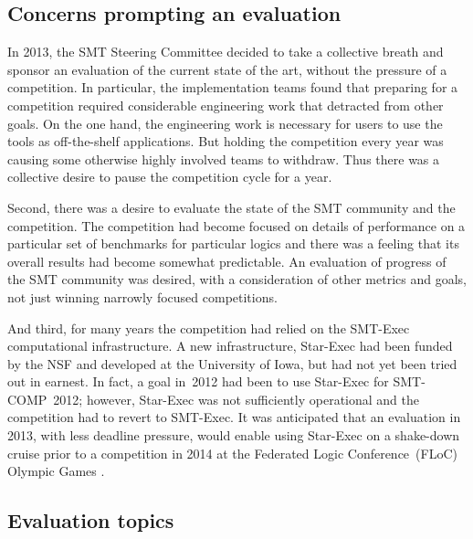 \documentclass{eptcs}
\begin{document}
\subsection{Concerns prompting an evaluation}

In 2013, the SMT Steering Committee decided to take a collective breath and sponsor an evaluation of the current state of the art, without the pressure of a competition. In particular, the implementation teams found that preparing for a competition required considerable engineering work that detracted from other goals. On the one hand, the engineering work is necessary for users to use the tools as off-the-shelf applications. But holding the competition every year was causing some otherwise highly involved teams to withdraw. Thus there was a collective desire to pause the competition cycle for a year.

Second, there was a desire to evaluate the state of the SMT community and the competition. The competition had become focused on details of performance on a particular set of benchmarks for particular logics and there was a feeling that its overall results had become somewhat predictable. An evaluation of progress of the SMT community was desired, with a consideration of other metrics and goals, not just winning narrowly focused competitions.
 
And third, for many years the competition had relied on the SMT-Exec computational infrastructure\cite{springerlink:10.1007/s10817-012-9246-5}.  A new infrastructure, Star-Exec \cite{StuST-IJCAR-14,webStarExec} had been funded by the NSF and developed at the University of Iowa, but had not yet been tried out in earnest.  In fact, a goal in~2012 had been to use Star-Exec for SMT-COMP~2012; however, Star-Exec was not sufficiently operational and the competition had to revert to SMT-Exec.  It was anticipated that an evaluation in 2013, with less deadline pressure, would enable using Star-Exec on a shake-down cruise prior to a competition in 2014 at the Federated Logic Conference~(FLoC) Olympic Games \cite{webOlympicGames}.

\subsection{Evaluation topics}
\end{document}
